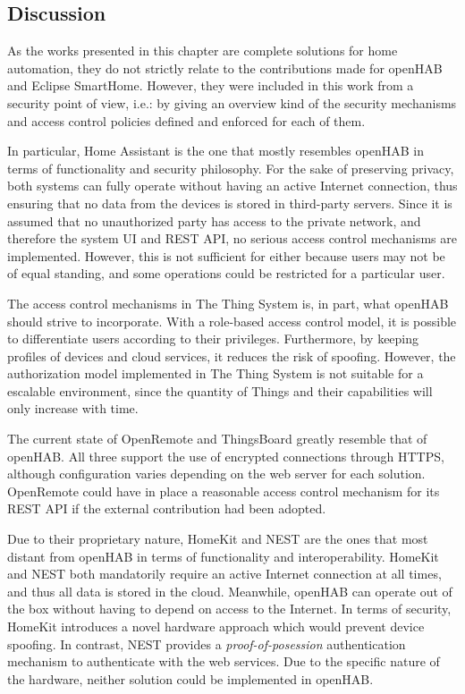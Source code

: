 \documentclass[12pt]{article}
\begin{document}
\subsection{Discussion}

As the works presented in this chapter are complete solutions for home automation, they do not strictly relate to the contributions made for openHAB and Eclipse SmartHome. However, they were included in this work from a security point of view, i.e.: by giving an overview kind of the security mechanisms and access control policies defined and enforced for each of them.

In particular, Home Assistant is the one that mostly resembles openHAB in terms of functionality and security philosophy. For the sake of preserving privacy, both systems can fully operate without having an active Internet connection, thus ensuring that no data from the devices is stored in third-party servers. Since it is assumed that no unauthorized party has access to the private network, and therefore the system UI and REST API, no serious access control mechanisms are implemented. However, this is not sufficient for either because users may not be of equal standing, and some operations could be restricted for a particular user.

The access control mechanisms in The Thing System is, in part, what openHAB should strive to incorporate. With a role-based access control model, it is possible to differentiate users according to their privileges. Furthermore, by keeping profiles of devices and cloud services, it reduces the risk of spoofing. However, the authorization model implemented in The Thing System is not suitable for a escalable environment, since the quantity of Things and their capabilities will only increase with time.

The current state of OpenRemote and ThingsBoard greatly resemble that of openHAB. All three support the use of encrypted connections through HTTPS, although configuration varies depending on the web server for each solution. OpenRemote could have in place a reasonable access control mechanism for its REST API if the external contribution had been adopted.

Due to their proprietary nature, HomeKit and NEST are the ones that most distant from openHAB in terms of functionality and interoperability. HomeKit and NEST both mandatorily require an active Internet connection at all times, and thus all data is stored in the cloud. Meanwhile, openHAB can operate out of the box without having to depend on access to the Internet. In terms of security, HomeKit introduces a novel hardware approach which would prevent device spoofing. In contrast, NEST provides a \emph{proof-of-posession} authentication mechanism to authenticate with the web services. Due to the specific nature of the hardware, neither solution could be implemented in openHAB. 
\end{document}
